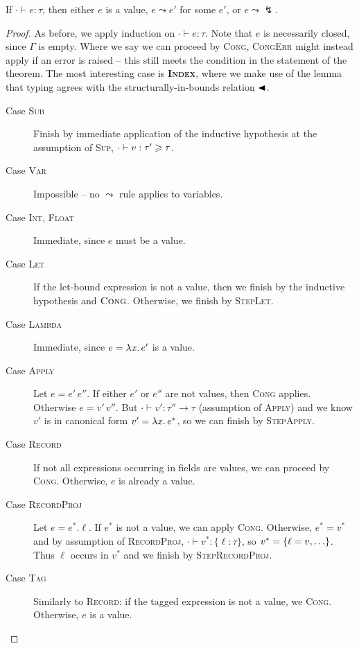 \begin{theorem}[Progress]
    If $\cdot \vdash e : \tau$, then either $e$ is a value, $e \leadsto e'$ for some $e'$, or $e \leadsto \lightning$.
\end{theorem}
\begin{proof}
As before, we apply induction on $\cdot \vdash e : \tau$. Note that $e$ is necessarily closed, since $\Gamma$ is empty. Where we say we can proceed by \textsc{Cong}, \textsc{CongErr} might instead apply if an error is raised -- this still meets the condition in the statement of the theorem. The most interesting case is \textbf{\textsc{Index}}, where we make use of the lemma that typing agrees with the structurally-in-bounds relation $\blacktriangleleft$.

\begin{description}
    \item[Case \textsc{Sub}] Finish by immediate application of the inductive hypothesis at the assumption of \textsc{Sup}, $\cdot \vdash v : \tau' \geqslant \tau$. 
    \item[Case \textsc{Var}] Impossible -- no $\leadsto$ rule applies to variables.
    \item[Case \textsc{Int}, \textsc{Float}] Immediate, since $e$ must be a value.
    \item[Case \textsc{Let}] If the let-bound expression is not a value, then we finish by the inductive hypothesis and $\textsc{Cong}$. Otherwise, we finish by \textsc{StepLet}.
    \item[Case \textsc{Lambda}] Immediate, since $e = \lambda x \ldotp e'$ is a value.
    \item[Case \textsc{Apply}] Let $e = e'\,e''$. If either $e'$ or $e''$ are not values, then \textsc{Cong} applies. Otherwise $e = v'\,v''$. But $\cdot \vdash v' : \tau'' \to \tau$ (assumption of \textsc{Apply}) and we know $v'$ is in canonical form $v' = \lambda x \ldotp e^*$, so we can finish by \textsc{StepApply}.
    \item[Case \textsc{Record}] If not all expressions occurring in fields are values, we can proceed by \textsc{Cong}. Otherwise, $e$ is already a value. 
    \item[Case \textsc{RecordProj}] Let $e = e^*{.}\ell$. If $e^*$ is not a value, we can apply \textsc{Cong}. Otherwise, $e^* = v^*$ and by assumption of \textsc{RecordProj}, $\cdot \vdash v^* : \{ \ell : \tau \}$, so $v^* = \srecordval{\ell = v, \dots}$. Thus $\ell$ occurs in $v^*$ and we finish by \textsc{StepRecordProj}.
    \item[Case \textsc{Tag}] Similarly to \textsc{Record}: if the tagged expression is not a value, we \textsc{Cong}. Otherwise, $e$ is a value.

\end{description}
\end{proof}
